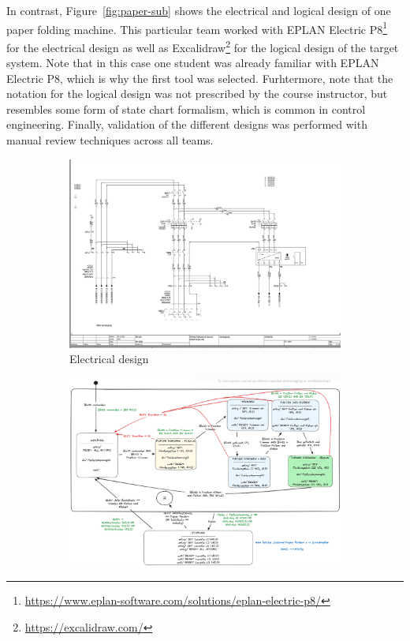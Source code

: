 \documentclass{PDS}
\begin{document}
In contrast, Figure~\ref{fig:paper-sub} shows the electrical and logical design of one paper folding machine.
This particular team worked with EPLAN Electric P8\footnote{\url{https://www.eplan-software.com/solutions/eplan-electric-p8/}} for the electrical design as well as Excalidraw\footnote{\url{https://excalidraw.com/}} for the logical design of the target system.
Note that in this case one student was already familiar with EPLAN Electric P8, which is why the first tool was selected.
Furhtermore, note that the notation for the logical design was not prescribed by the course instructor, but resembles some form of state chart formalism, which is common in control engineering.
Finally, validation of the different designs was performed with manual review techniques across all teams.

\begin{figure}[htbp]
    \centering
    \begin{subfigure}[b]{0.4\textwidth}
        \includegraphics[width=\textwidth]{./figures/paper_electric.png}
        \caption{Electrical design}
        \label{fig:paper-sub-1}
    \end{subfigure}
    \hspace{0.05\textwidth}
    \begin{subfigure}[b]{0.45\textwidth}
        \includegraphics[width=\textwidth]{./figures/paper_control.png}

\end{subfigure}
\end{figure}
\end{document}
